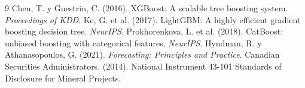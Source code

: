 \documentclass[12pt,letterpaper]{article}
\begin{document}
\begin{thebibliography}{9}
 Chen, T. y Guestrin, C. (2016). XGBoost: A scalable tree boosting system. \textit{Proceedings of KDD}.
 Ke, G. et al. (2017). LightGBM: A highly efficient gradient boosting decision tree. \textit{NeurIPS}.
 Prokhorenkova, L. et al. (2018). CatBoost: unbiased boosting with categorical features. \textit{NeurIPS}.
 Hyndman, R. y Athanasopoulos, G. (2021). \textit{Forecasting: Principles and Practice}.
 Canadian Securities Administrators. (2014). National Instrument 43-101 Standards of Disclosure for Mineral Projects.
\end{thebibliography}
\end{document}

